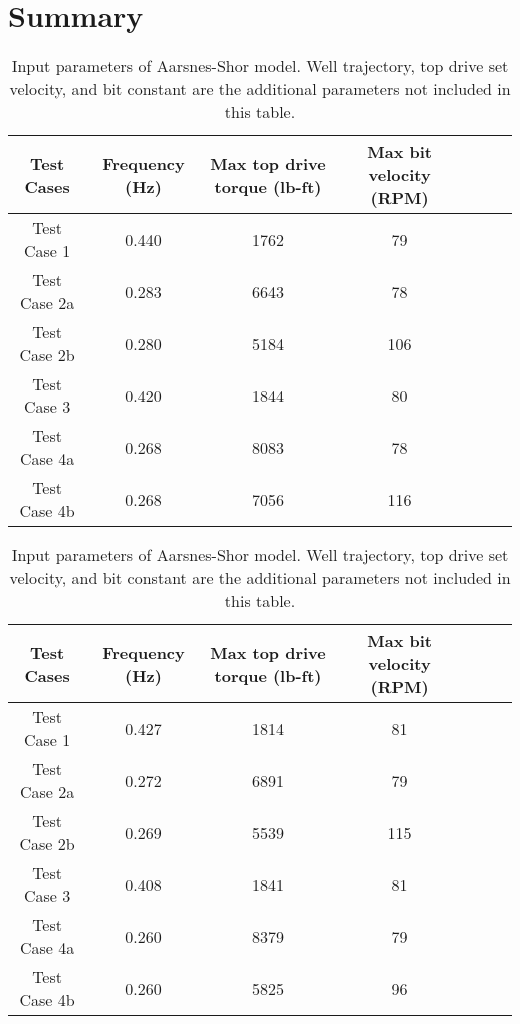 \section{Summary} 
\begin{table}
    \centering
    \begin{tabular}{|c|c|c|c|c|c|c|}
        \hline
        \textbf{Test Cases} & \textbf{Frequency (Hz)} & \textbf{Max top drive torque (lb-ft)} & \textbf{Max bit velocity (RPM)}\\
        \hline
        Test Case 1 & 0.440 & 1762 & 79\\
        \hline
        Test Case 2a & 0.283 & 6643 & 78\\
        \hline
        Test Case 2b & 0.280 & 5184 & 106\\ 
        \hline
        Test Case 3 & 0.420 & 1844 & 80 \\                                                  
        \hline
        Test Case 4a & 0.268 & 8083 & 78 \\                                                   
        \hline
        Test Case 4b & 0.268 & 7056 & 116\\                                                       
        \hline
    \end{tabular}
    \caption[Input parameters of Aarsnes-Shor model (Python ver.)]{Input parameters of Aarsnes-Shor model. Well trajectory, top drive set velocity, and bit constant are the additional parameters not included in this table.}
    \label{AS_results_summary}
\end{table} 

\begin{table}
    \centering
    \begin{tabular}{|c|c|c|c|c|c|c|}
        \hline
        \textbf{Test Cases} & \textbf{Frequency (Hz)} & \textbf{Max top drive torque (lb-ft)} & \textbf{Max bit velocity (RPM)}\\
        \hline
        Test Case 1  & 0.427 & 1814 & 81\\
        \hline
        Test Case 2a  & 0.272 & 6891 & 79\\
        \hline
        Test Case 2b  & 0.269 & 5539 & 115\\ 
        \hline
        Test Case 3  & 0.408 & 1841 & 81\\                                                  
        \hline
        Test Case 4a  & 0.260 & 8379 & 79\\                                                   
        \hline
        Test Case 4b & 0.260 & 5825 & 96\\                                                       
        \hline
    \end{tabular}
    \caption[Input parameters of Aarsnes-Shor model (Python ver.)]{Input parameters of Aarsnes-Shor model. Well trajectory, top drive set velocity, and bit constant are the additional parameters not included in this table.}
    \label{Exxon_results_summary}
\end{table}